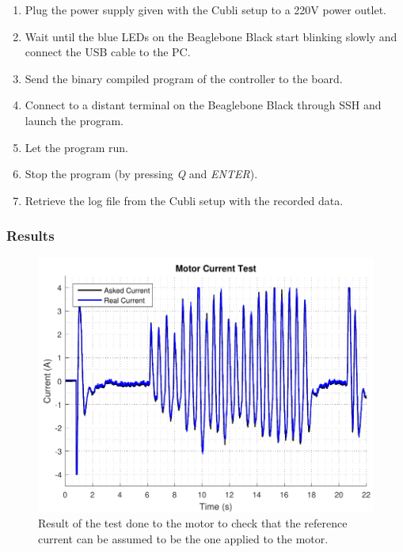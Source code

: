 \begin{enumerate}
  \item Plug the power supply given with the Cubli setup to a \si{220}{V} power outlet.
  \item Wait until the blue LEDs on the Beaglebone Black start blinking slowly and connect the USB cable to the PC.
  \item Send the binary compiled program of the controller to the board.
  \item Connect to a distant terminal on the Beaglebone Black through SSH and launch the program.
  \item Let the program run.
  \item Stop the program (by pressing \textit{Q} and \textit{ENTER}).
  \item Retrieve the log file from the Cubli setup with the recorded data.
\end{enumerate}

\subsubsection{Results}

\begin{figure}[H]
	\includegraphics[scale=.75]{figures/motorCurrentTest}
	\centering
	\caption{Result of the test done to the motor to check that the reference current can be assumed to be the one applied to the motor.}
  \label{motorCurrentTest}
\end{figure}\vspace{-18pt}